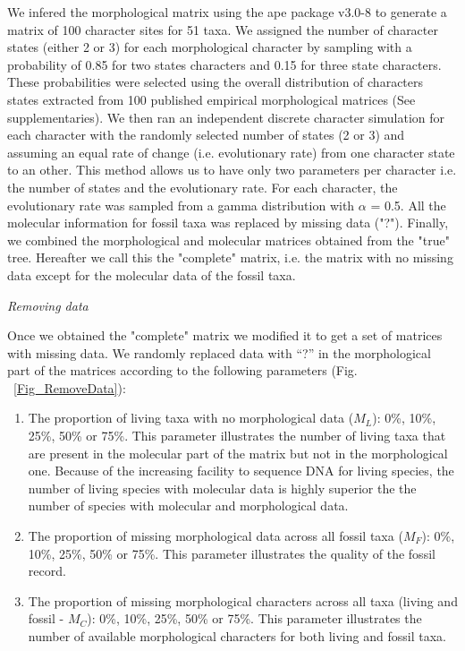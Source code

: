 \documentclass[12pt,letterpaper]{article}
\renewcommand{\subsection}[1]{%
\bigskip
\begin{center}
\begin{large}
\normalfont\itshape #1
\end{large}
\end{center}}
\begin{document}
We infered the morphological matrix using the ape package v3.0-8 \citep{paradisape:2004} to generate a matrix of 100 character sites for 51 taxa. We assigned the number of character states (either 2 or 3) for each morphological character by sampling with a probability of 0.85 for two states characters and 0.15 for three state characters. These probabilities were selected using the overall distribution of characters states extracted from 100 published empirical morphological matrices (See supplementaries). %
We then ran an independent discrete character simulation for each character with the randomly selected number of states (2 or 3) and assuming an equal rate of change (i.e. evolutionary rate) from one character state to an other. This method allows us to have only two parameters per character i.e. the number of states and the evolutionary rate. For each character, the evolutionary rate was sampled from a gamma distribution with $\alpha$ = 0.5.  All the molecular information for fossil taxa was replaced by missing data ("?"). Finally, we combined the morphological and molecular matrices obtained from the "true" tree. Hereafter we call this the "complete" matrix, i.e. the matrix with no missing data except for the molecular data of the fossil taxa.

\subsection{Removing data}
Once we obtained the "complete" matrix we modified it to get a set of matrices with missing data. We randomly replaced data with “?” in the morphological part of the matrices according to the following parameters (Fig. ~\ref{Fig_RemoveData}):

\begin{enumerate}
\item{The proportion of living taxa with no morphological data ($M_{L}$): 0\%, 10\%, 25\%, 50\% or 75\%.}
This parameter illustrates the number of living taxa that are present in the molecular part of the matrix but not in the morphological one. Because of the increasing facility to sequence DNA for living species, the number of living species with molecular data is highly superior the the number of species with molecular and morphological data.
\item{The proportion of missing morphological data across all fossil taxa ($M_{F}$): 0\%, 10\%, 25\%, 50\% or 75\%.}
This parameter illustrates the quality of the fossil record. 
\item{The proportion of missing morphological characters across all taxa (living and fossil - $M_{C}$): 0\%, 10\%, 25\%, 50\% or 75\%. }
This parameter illustrates the number of available morphological characters for both living and fossil taxa.
\end{enumerate}
\end{document}
